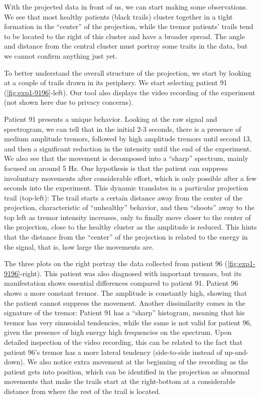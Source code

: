 With the projected data in front of us, we can start making some observations. We see that most healthy patients (black trails) cluster together in a tight formation in the ``center'' of the projection, while the tremor patients' trails tend to be located to the right of this cluster and have a broader spread. The angle and distance from the central cluster must portray some traits in the data, but we cannot confirm anything just yet.   

To better understand the overall structure of the projection, we  start by looking at a couple of trails drawn in its periphery. We start selecting patient 91 (\cref{fig:exp1-9196}-left). Our tool also displays the video recording of the experiment (not shown here due to privacy concerns). 

Patient 91 presents a unique behavior. Looking at the raw signal and spectrogram, we can tell that in the initial 2-3 seconds, there is a presence of medium amplitude tremors, followed by high amplitude tremors until second 13, and then a significant reduction in the intensity until the end of the experiment. We also see that the movement is decomposed into a ``sharp'' spectrum, mainly focused on around 5 Hz. One hypothesis is that the patient can suppress involuntary movements after considerable effort, which is only possible after a few seconds into the experiment. This dynamic translates in a particular projection trail (top-left): The trail starts a certain distance away from the center of the projection, characteristic of ``unhealthy'' behavior, and then ``shoots'' away to the top left as tremor intensity increases, only to finally move closer to the center of the projection, close to the healthy cluster as the amplitude is reduced. This hints that the distance from the ``center'' of the projection is related to the energy in the signal, that is, how large the movements are. 

The three plots on the right portray the data collected from patient 96 (\cref{fig:exp1-9196}-right). This patient was also diagnosed with important tremors, but its manifestation shows essential differences compared to patient 91. Patient 96 shows a more constant tremor. The amplitude is constantly high, showing that the patient cannot suppress the movement. Another dissimilarity comes in the signature of the tremor: Patient 91 has a ``sharp'' histogram, meaning that his tremor has very sinusoidal tendencies, while the same is not valid for patient 96, given the presence of high energy high frequencies on the spectrum. Upon detailed inspection of the video recording, this can be related to the fact that patient 96's tremor has a more lateral tendency (side-to-side instead of up-and-down). We also notice extra movement at the beginning of the recording as the patient gets into position, which can be identified in the projection as abnormal movements that make the trails start at the right-bottom at a considerable distance from where the rest of the trail is located.  

